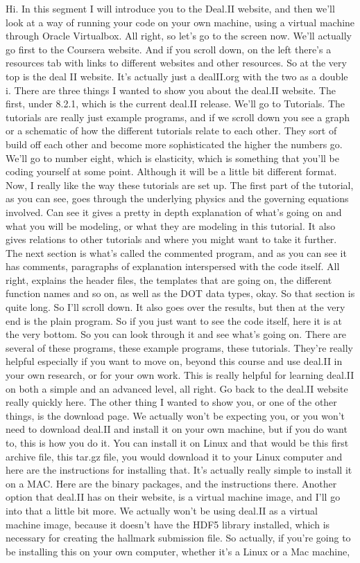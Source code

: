 \documentclass[10pt]{article}
\begin{document}
Hi. In this segment I will introduce you to the Deal.II website, and then we'll look at a way of running your code on your own machine, using a virtual machine through Oracle Virtualbox. All right, so let's go to the screen now. We'll actually go first to the Coursera website. And if you scroll down, on the left there's a resources tab with links to different websites and other resources. So at the very top is the deal II website. It's actually just a dealII.org with the two as a double i. There are three things I wanted to show you about the deal.II website. The first, under 8.2.1, which is the current deal.II release. We'll go to Tutorials. The tutorials are really just example programs, and if we scroll down you see a graph or a schematic of how the different tutorials relate to each other. They sort of build off each other and become more sophisticated the higher the numbers go. We'll go to number eight, which is elasticity, which is something that you'll be coding yourself at some point. Although it will be a little bit different format. Now, I really like the way these tutorials are set up. The first part of the tutorial, as you can see, goes through the underlying physics and the governing equations involved. Can see it gives a pretty in depth explanation of what's going on and what you will be modeling, or what they are modeling in this tutorial. It also gives relations to other tutorials and where you might want to take it further. The next section is what's called the commented program, and as you can see it has comments, paragraphs of explanation interspersed with the code itself. All right, explains the header files, the templates that are going on, the different function names and so on, as well as the DOT data types, okay. So that section is quite long. So I'll scroll down. It also goes over the results, but then at the very end is the plain program. So if you just want to see the code itself, here it is at the very bottom. So you can look through it and see what's going on. There are several of these programs, these example programs, these tutorials. They're really helpful especially if you want to move on, beyond this course and use deal.II in your own research, or for your own work. This is really helpful for learning deal.II on both a simple and an advanced level, all right. Go back to the deal.II website really quickly here. The other thing I wanted to show you, or one of the other things, is the download page. We actually won't be expecting you, or you won't need to download deal.II and install it on your own machine, but if you do want to, this is how you do it. You can install it on Linux and that would be this first archive file, this tar.gz file, you would download it to your Linux computer and here are the instructions for installing that. It's actually really simple to install it on a MAC. Here are the binary packages, and the instructions there. Another option that deal.II has on their website, is a virtual machine image, and I'll go into that a little bit more. We actually won't be using deal.II as a virtual machine image, because it doesn't have the HDF5 library installed, which is necessary for creating the hallmark submission file. So actually, if you're going to be installing this on your own computer, whether it's a Linux or a Mac machine, 
\end{document}
